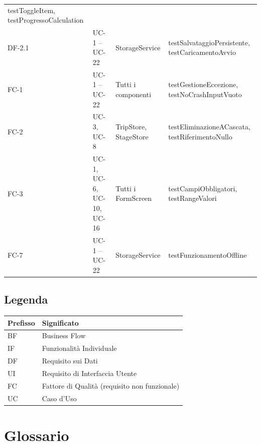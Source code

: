 \documentclass[12pt, a4paper]{article}
\begin{document}
\begin{longtable}{@{}L{1.8cm}L{3.5cm}L{3.5cm}L{5.2cm}@{}}
    testToggleItem, testProgressoCalculation \\
  DF-2.1 & UC-1 -- UC-22 & StorageService &
    testSalvataggioPersistente, testCaricamentoAvvio \\
  \midrule
  FC-1 & UC-1 -- UC-22 & Tutti i componenti &
    testGestioneEccezione, testNoCrashInputVuoto \\
  FC-2 & UC-3, UC-8 & TripStore, StageStore &
    testEliminazioneACascata, testRiferimentoNullo \\
  FC-3 & UC-1, UC-6, UC-10, UC-16 & Tutti i FormScreen &
    testCampiObbligatori, testRangeValori \\
  FC-7 & UC-1 -- UC-22 & StorageService &
    testFunzionamentoOffline \\
\end{longtable}
\endgroup

\subsection{Legenda}

\begin{tabular}{@{}ll@{}}
  \toprule
  \textbf{Prefisso} & \textbf{Significato} \\
  \midrule
  BF & Business Flow \\
  IF & Funzionalità Individuale \\
  DF & Requisito sui Dati \\
  UI & Requisito di Interfaccia Utente \\
  FC & Fattore di Qualità (requisito non funzionale) \\
  UC & Caso d'Uso \\
  \bottomrule
\end{tabular}

\appendix
\section{Glossario}
\end{document}
